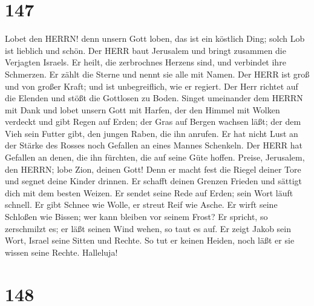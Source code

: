 \hypertarget{section-146}{%
\section{147}\label{section-146}}

 Lobet den HERRN! denn unsern Gott loben, das ist ein
köstlich Ding; solch Lob ist lieblich und schön.  Der HERR
baut Jerusalem und bringt zusammen die Verjagten Israels. 
Er heilt, die zerbrochnes Herzens sind, und verbindet ihre Schmerzen.
 Er zählt die Sterne und nennt sie alle mit Namen.
 Der HERR ist groß und von großer Kraft; und ist
unbegreiflich, wie er regiert.  Der Herr richtet auf die
Elenden und stößt die Gottlosen zu Boden.  Singet umeinander
dem HERRN mit Dank und lobet unsern Gott mit Harfen,  der
den Himmel mit Wolken verdeckt und gibt Regen auf Erden; der Gras auf
Bergen wachsen läßt;  der dem Vieh sein Futter gibt, den
jungen Raben, die ihn anrufen.  Er hat nicht Lust an der
Stärke des Rosses noch Gefallen an eines Mannes Schenkeln. 
Der HERR hat Gefallen an denen, die ihn fürchten, die auf seine Güte
hoffen.  Preise, Jerusalem, den HERRN; lobe Zion, deinen
Gott!  Denn er macht fest die Riegel deiner Tore und segnet
deine Kinder drinnen.  Er schafft deinen Grenzen Frieden
und sättigt dich mit dem besten Weizen.  Er sendet seine
Rede auf Erden; sein Wort läuft schnell.  Er gibt Schnee
wie Wolle, er streut Reif wie Asche.  Er wirft seine
Schloßen wie Bissen; wer kann bleiben vor seinem Frost?  Er
spricht, so zerschmilzt es; er läßt seinen Wind wehen, so taut es auf.
 Er zeigt Jakob sein Wort, Israel seine Sitten und Rechte.
 So tut er keinen Heiden, noch läßt er sie wissen seine
Rechte. Halleluja!

\hypertarget{section-147}{%
\section{148}\label{section-147}}

